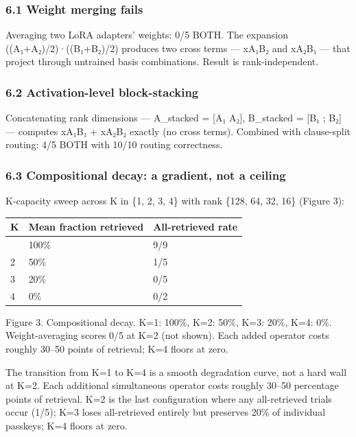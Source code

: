 \subsubsection{6.1 Weight merging fails}\label{weight-merging-fails}

Averaging two LoRA adapters' weights: 0/5 BOTH. The expansion ((A₁+A₂)/2)·((B₁+B₂)/2) produces two cross terms --- xA₁B₂ and xA₂B₁ --- that project through untrained basis combinations. Result is rank-independent.

\subsubsection{6.2 Activation-level block-stacking}\label{activation-level-block-stacking}

Concatenating rank dimensions --- A\_stacked = {[}A₁ \textbar{} A₂{]}, B\_stacked = {[}B₁ ; B₂{]} --- computes xA₁B₁ + xA₂B₂ exactly (no cross terms). Combined with clause-split routing: 4/5 BOTH with 10/10 routing correctness.

\subsubsection{6.3 Compositional decay: a gradient, not a ceiling}\label{compositional-decay-a-gradient-not-a-ceiling}

K-capacity sweep across K in \{1, 2, 3, 4\} with rank \{128, 64, 32, 16\} (Figure 3):

{\def\LTcaptype{none} %
\begin{longtable}[]{@{}lll@{}}
\toprule\noalign{}
K & Mean fraction retrieved & All-retrieved rate \\
\midrule\noalign{}
\endhead
\bottomrule\noalign{}
\endlastfoot
1 & 100\% & 9/9 \\
2 & 50\% & 1/5 \\
3 & 20\% & 0/5 \\
4 & 0\% & 0/2 \\
\end{longtable}
}

Figure 3. Compositional decay. K=1: 100\%, K=2: 50\%, K=3: 20\%, K=4: 0\%. Weight-averaging scores 0/5 at K=2 (not shown). Each added operator costs roughly 30--50 points of retrieval; K=4 floors at zero.

The transition from K=1 to K=4 is a smooth degradation curve, not a hard wall at K=2. Each additional simultaneous operator costs roughly 30--50 percentage points of retrieval. K=2 is the last configuration where any all-retrieved trials occur (1/5); K=3 loses all-retrieved entirely but preserves 20\% of individual passkeys; K=4 floors at zero.

